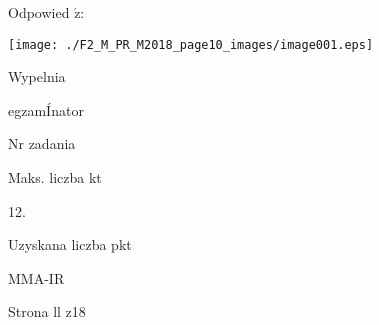 \documentclass[a4paper,12pt]{article}
\begin{document}
Odpowied $\acute{\mathrm{z}}$:
\begin{center}
\texttt{[image: ./F2\_M\_PR\_M2018\_page10\_images/image001.eps]}
\end{center}
Wypelnia

egzamÍnator

Nr zadania

Maks. liczba kt

12.

Uzyskana liczba pkt

MMA-IR

Strona ll z18
\end{document}
